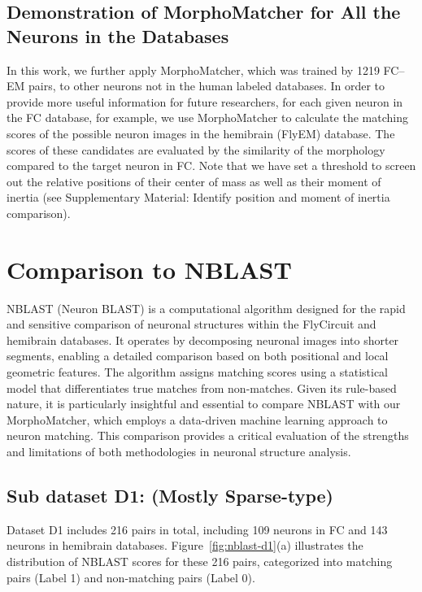 \documentclass[10pt,a4paper]{article}
\begin{document}
\subsection{Demonstration of MorphoMatcher for All the Neurons in the Databases}

In this work, we further apply MorphoMatcher, which was trained by 1219 FC--EM
pairs, to other neurons not in the human labeled databases. In order to provide
more useful information for future researchers, for each given neuron in the FC
database, for example, we use MorphoMatcher to calculate the matching scores of
the possible neuron images in the hemibrain (FlyEM) database. The scores of
these candidates are evaluated by the similarity of the morphology compared to
the target neuron in FC. Note that we have set a threshold to screen out the
relative positions of their center of mass as well as their moment of inertia
(see Supplementary Material: Identify position and moment of inertia comparison).

\section{Comparison to NBLAST}

NBLAST (Neuron BLAST) is a computational algorithm designed for the rapid and
sensitive comparison of neuronal structures within the FlyCircuit and hemibrain
databases. It operates by decomposing neuronal images into shorter segments,
enabling a detailed comparison based on both positional and local geometric
features. The algorithm assigns matching scores using a statistical model that
differentiates true matches from non-matches. Given its rule-based nature, it is
particularly insightful and essential to compare NBLAST with our MorphoMatcher,
which employs a data-driven machine learning approach to neuron matching. This
comparison provides a critical evaluation of the strengths and limitations of
both methodologies in neuronal structure analysis.

\subsection{Sub dataset D1: (Mostly Sparse-type)}

Dataset D1 includes 216 pairs in total, including 109 neurons in FC and 143
neurons in hemibrain databases. Figure~\ref{fig:nblast-d1}(a) illustrates the
distribution of NBLAST scores for these 216 pairs, categorized into matching
pairs (Label 1) and non-matching pairs (Label 0).
\end{document}
